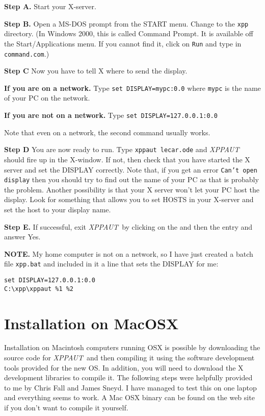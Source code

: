 \documentclass{article}
\newcommand{\XPP}{{\sl XPPAUT\, }}
\newcommand{\ppc}[1]{\fbox{{\tt #1}}}
\newcommand{\xpp}{{\sl xpp\, }}
\begin{document}
\begin{description}
\begin{description}
\item{\bf Step A.} Start your X-server.   
\item{\bf Step B.} Open a MS-DOS prompt from the START menu. Change to
the {\tt xpp} directory. (In Windows 2000, this is called Command
Prompt. It is available off the Start/Applications menu.
If you cannot find it, click on {\tt Run} and type in {\tt
command.com}.)  
\item{\bf Step C} Now you have to tell X where to send the display.
\begin{description}
\item{\bf If you are on a network.} Type {\tt set
DISPLAY=mypc:0.0} where {\tt mypc} is the name of your PC on the
network. 
\item{\bf If you are not on a network.} Type {\tt set
DISPLAY=127.0.0.1:0.0}
\end{description}
Note that even on a network, the second command usually works.
\item{\bf Step D} You are now ready to run. Type {\tt xppaut 
lecar.ode} and \XPP should fire up in the
X-window. 
If not, then
check that you have started the X server and set the DISPLAY
correctly. Note that, if you get an error {\tt Can't open display}
then you should try to find out the name of your PC as that is probably
the problem. Another possibility is that your X server won't let your
PC host the display. Look for something that allows you to set HOSTS
in your X-server and set the host to your display name. 
\item{\bf Step E.} If successful, exit \XPP by clicking on the \ppc{File} and
then the \ppc{Quit} entry and answer Yes.  
\end{description}
{\bf NOTE.}   My home computer is not on a network, so I have just
created a batch file {\tt xpp.bat} and included in it a line that
sets the DISPLAY for me:
\begin{verbatim}
set DISPLAY=127.0.0.1:0.0
C:\xpp\xppaut %1 %2
\end{verbatim}
\end{description}

\section{Installation on MacOSX}
Installation on  Macintosh computers running OSX is possible by
downloading the source code for \XPP and then compiling it using the
software development tools provided for the new OS. In addition, you
will need to download the X development libraries to compile it.  The
following steps were helpfully provided to me by Chris Fall and James
Sneyd. I have managed to test this on one laptop and everything seems
to work.  A Mac OSX binary can be found on the web site if you don't
want to compile it yourself.
\end{document}
